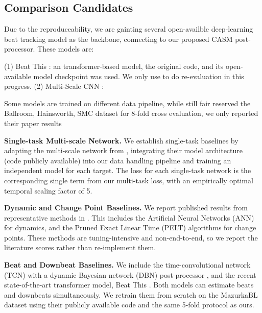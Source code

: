 \documentclass{article}
\begin{document}
\subsection{Comparison Candidates}
\label{ssec:candidates}
Due to the reproduceability, we are gainting several open-availble deep-learning beat tracking model as the backbone, connecting to our proposed CASM post-processor. These models are:

(1) Beat This \cite{foscarin2024beat}: an transformer-based model, the original code, and its open-available model checkpoint was used. We only use to do re-evaluation in this progress.
(2) Multi-Scale CNN \cite{}: 

Some models are trained on different data pipeline, while still fair reserved the Ballroom, Hainsworth, SMC dataset for 8-fold cross evaluation, we only reported their paper results 


\noindent\textbf{Single-task Multi-scale Network.} We establish single-task baselines by adapting the multi-scale network from \cite{li2023frame}, integrating their model architecture (code publicly available) into our data handling pipeline and training an independent model for each target. The loss for each single-task network is the corresponding single term from our multi-task loss, with an empirically optimal temporal scaling factor of 5.

\noindent\textbf{Dynamic and Change Point Baselines.} We report published results from representative methods in \cite{kosta2017thesis}. This includes the Artificial Neural Networks (ANN) for dynamics, and the Pruned Exact Linear Time (PELT) algorithms for change points. These methods are tuning-intensive and non-end-to-end, so we report the literature scores rather than re-implement them.

\noindent\textbf{Beat and Downbeat Baselines.} We include the time-convolutional network (TCN) with a dynamic Bayesian network (DBN) post-processor \cite{bock2020deconstruct}, and the recent state-of-the-art transformer model, Beat This \cite{foscarin2024beat}. Both models can estimate beats and downbeats simultaneously. We retrain them from scratch on the MazurkaBL dataset using their publicly available code and the same 5-fold protocol as ours.
\end{document}

